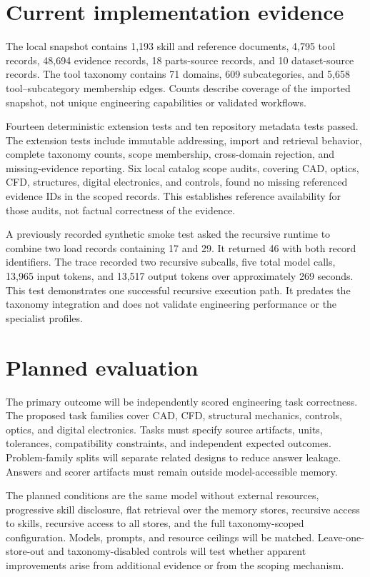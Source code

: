 \documentclass{article}
\begin{document}
\section{Current implementation evidence}
The local snapshot contains 1,193 skill and reference documents, 4,795 tool records, 48,694 evidence records, 18 parts-source records, and 10 dataset-source records. The tool taxonomy contains 71 domains, 609 subcategories, and 5,658 tool--subcategory membership edges. Counts describe coverage of the imported snapshot, not unique engineering capabilities or validated workflows.

Fourteen deterministic extension tests and ten repository metadata tests passed. The extension tests include immutable addressing, import and retrieval behavior, complete taxonomy counts, scope membership, cross-domain rejection, and missing-evidence reporting. Six local catalog scope audits, covering CAD, optics, CFD, structures, digital electronics, and controls, found no missing referenced evidence IDs in the scoped records. This establishes reference availability for those audits, not factual correctness of the evidence.

A previously recorded synthetic smoke test asked the recursive runtime to combine two load records containing 17 and 29. It returned 46 with both record identifiers. The trace recorded two recursive subcalls, five total model calls, 13,965 input tokens, and 13,517 output tokens over approximately 269 seconds. This test demonstrates one successful recursive execution path. It predates the taxonomy integration and does not validate engineering performance or the specialist profiles.

\section{Planned evaluation}
The primary outcome will be independently scored engineering task correctness. The proposed task families cover CAD, CFD, structural mechanics, controls, optics, and digital electronics. Tasks must specify source artifacts, units, tolerances, compatibility constraints, and independent expected outcomes. Problem-family splits will separate related designs to reduce answer leakage. Answers and scorer artifacts must remain outside model-accessible memory.

The planned conditions are the same model without external resources, progressive skill disclosure, flat retrieval over the memory stores, recursive access to skills, recursive access to all stores, and the full taxonomy-scoped configuration. Models, prompts, and resource ceilings will be matched. Leave-one-store-out and taxonomy-disabled controls will test whether apparent improvements arise from additional evidence or from the scoping mechanism.
\end{document}
